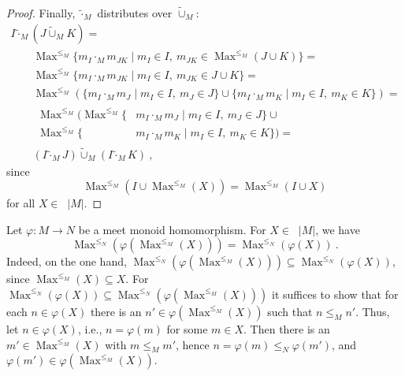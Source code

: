 \documentclass[english]{notes}
\DeclareMathOperator{\Maxop}{\mathrm{Max}}
\newcommand{\Max}[1]{\Maxop^{#1}}
\DeclareMathOperator{\finsets}{\mathcal{P}_{\mathrm{fin}}}
\newcommand{\mtimes}[1]{\mathbin{\tilde{\cdot}_{#1}}}
\newcommand{\mplus}[1]{\mathbin{\tilde{\cup}_{#1}}}
\begin{document}
\begin{proof}
Finally, $\mtimes{M}$ distributes over $\mplus{M}$:
%
\begin{gather*}
  I \mtimes{M} (J \mplus{M} K)
={}\\\qquad
  \Max{\leq_M} \{ m_I \cdot_M m_{JK} \mid m_I \in I,\ m_{JK} \in \Max{\leq_M}(J \cup K) \}
={}\\\qquad
  \Max{\leq_M} \{ m_I \cdot_M m_{JK} \mid m_I \in I,\ m_{JK} \in J \cup K \}
={}\\\qquad
  \Max{\leq_M}(\{ m_I \cdot_M m_J \mid m_I \in I,\ m_J \in J \} \cup \{ m_I \cdot_M m_K \mid m_I \in I,\ m_K \in K \})
={}\\\qquad\begin{split}
  \Max{\leq_M}(\Max{\leq_M} \{ &m_I \cdot_M m_J \mid m_I \in I,\ m_J \in J \} \cup{}\\[-.4ex]
               \Max{\leq_M} \{ &m_I \cdot_M m_K \mid m_I \in I,\ m_K \in K \}) ={}
\end{split}\\\qquad
  (I \mtimes{M} J) \mplus{M} (I \mtimes{M} K)
\ \text{,}
\end{gather*}
since
%
\begin{equation*}
  \Max{\leq_M}(I \cup \Max{\leq_M}(X)) = \Max{\leq_M}(I \cup X)
\end{equation*}
%
for all $X \in \finsets |M|$.
\end{proof}

Let $\varphi : M \to N$ be a meet monoid homomorphism.  For $X \in
\finsets |M|$, we have
%
\begin{equation*}
  \Max{\leq_N}(\varphi(\Max{\leq_M}(X))) = \Max{\leq_N}(\varphi(X))
\ \text{.}
\end{equation*}
%
Indeed, on the one hand, $\Max{\leq_N}(\varphi(\Max{\leq_M}(X)))
\subseteq \Max{\leq_N}(\varphi(X))$, since $\Max{\leq_M}(X) \subseteq
X$.  For $\Max{\leq_N}(\varphi(X)) \subseteq
\Max{\leq_N}(\varphi(\Max{\leq_M}(X)))$ it suffices to show that for
each $n \in \varphi(X)$ there is an $n' \in \varphi(\Max{\leq_M}(X))$
such that $n \leq_M n'$.  Thus, let $n \in \varphi(X)$, i.e., $n =
\varphi(m)$ for some $m \in X$.  Then there is an $m' \in
\Max{\leq_M}(X)$ with $m \leq_M m'$, hence $n = \varphi(m) \leq_N
\varphi(m')$, and $\varphi(m') \in \varphi(\Max{\leq_M}(X))$.
\end{document}
